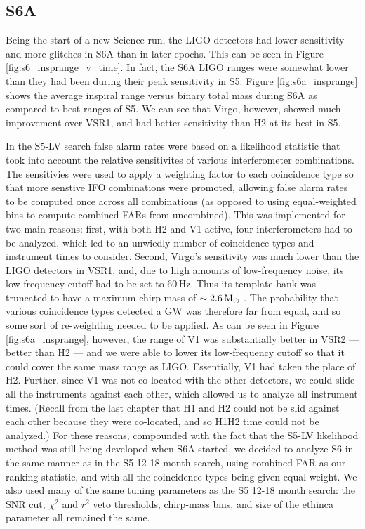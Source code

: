 \subsection{S6A}
\label{sec:s6a}

Being the start of a new Science run, the \ac{LIGO} detectors had lower sensitivity and more glitches in S6A than in later epochs. This can be seen in Figure \ref{fig:s6_insprange_v_time}. In fact, the S6A \ac{LIGO} ranges were somewhat lower than they had been during their peak sensitivity in \ac{S5}. Figure \ref{fig:s6a_insprange} shows the average inspiral range versus binary total mass during S6A as compared to best ranges of \ac{S5}. We can see that Virgo, however, showed much improvement over VSR1, and had better sensitivity than H2 at its best in \ac{S5}.

In the \ac{S5}-LV search false alarm rates were based on a likelihood statistic that took into account the relative sensitivites of various interferometer combinations. The sensitivies were used to apply a weighting factor to each coincidence type so that more senstive \ac{IFO} combinations were promoted, allowing false alarm rates to be computed once across all combinations (as opposed to using equal-weighted bins to compute combined \acp{FAR} from uncombined). This was implemented for two main reasons: first, with both H2 and V1 active, four interferometers had to be analyzed, which led to an unwiedly number of coincidence types and instrument times to consider. Second, Virgo's sensitivity was much lower than the \ac{LIGO} detectors in VSR1, and, due to high amounts of low-frequency noise, its low-frequency cutoff had to be set to $60\,$Hz. Thus its template bank was truncated to have a maximum chirp mass of $\sim2.6\,\mathrm{M_\odot}$ \cite{ref:s5lvc}. The probability that various coincidence types detected a \ac{GW} was therefore far from equal, and so some sort of re-weighting needed to be applied. As can be seen in Figure \ref{fig:s6a_insprange}, however, the range of V1 was substantially better in \ac{VSR2} --- better than H2 --- and we were able to lower its low-frequency cutoff so that it could cover the same mass range as \ac{LIGO}. Essentially, V1 had taken the place of H2. Further, since V1 was not co-located with the other detectors, we could slide all the instruments against each other, which allowed us to analyze all instrument times. (Recall from the last chapter that H1 and H2 could not be slid against each other because they were co-located, and so H1H2 time could not be analyzed.) For these reasons, compounded with the fact that the \ac{S5}-LV likelihood method was still being developed when S6A started, we decided to analyze \ac{S6} in the same manner as in the \ac{S5} 12-18 month search, using combined \ac{FAR} as our ranking statistic, and with all the coincidence types being given equal weight. We also used many of the same tuning parameters as the \ac{S5} 12-18 month search: the \ac{SNR} cut, $\chi^2$ and $r^2$ veto thresholds, chirp-mass bins, and size of the ethinca parameter all remained the same.

